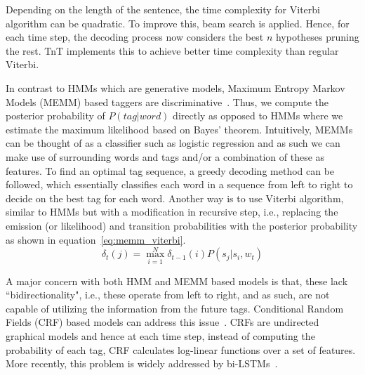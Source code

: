 


Depending on the length of the sentence, the time complexity for Viterbi algorithm can be quadratic. To improve this, beam search is applied. Hence, for each time step, the decoding process now considers the best $n$ hypotheses pruning the rest. TnT implements this to achieve better time complexity than regular Viterbi. 


In contrast to HMMs which are generative models, Maximum Entropy Markov Models (MEMM) based taggers are discriminative~\citep{ratnaparkhi1996maximum}. Thus, we compute the posterior probability of $P(tag|word)$ directly as opposed to HMMs where we estimate the maximum likelihood based on Bayes' theorem. Intuitively, MEMMs can be thought of as a classifier such as logistic regression and as such we can make use of surrounding words and tags and/or a combination of these as features. To find an optimal tag sequence, a greedy decoding method can be followed, which essentially classifies each word in a sequence from left to right to decide on the best tag for each word. Another way is to use Viterbi algorithm, similar to HMMs but with a modification in recursive step, i.e., replacing the emission (or likelihood) and transition probabilities with the posterior probability as shown in equation~\ref{eq:memm_viterbi}.
\begin{equation} \label{eq:memm_viterbi}
    \delta_{t}(j) = \max_{i=1}^{N} \delta_{t-1}(i)P(s_j|s_i,w_t)
\end{equation}

A major concern with both HMM and MEMM based models is that, these lack ``bidirectionality", i.e., these operate from left to right, and as such, are not capable of utilizing the information from the future tags. Conditional Random Fields (CRF) based models can address this issue~\citep{lafferty2001conditional}. CRFs are undirected graphical models and hence at each time step, instead of computing the probability of each tag, CRF calculates log-linear functions over a set of features. More recently, this problem is widely addressed by bi-LSTMs~\citep{huang2015bidirectional,plank2016multilingual}. 


